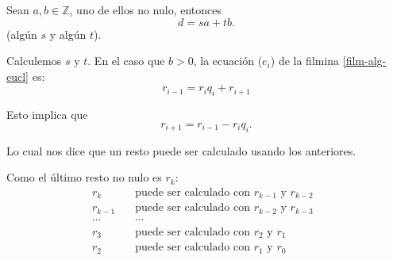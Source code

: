 \documentclass[handout]{beamer} %
\begin{document}
	
	
	\begin{frame}\label{film-alg-eucl-2}
		
		Sean $a, b \in \mathbb{Z}$, uno de ellos no nulo, entonces 
		$$
		d=sa+tb.
		$$
		(algún $s$ y algún $t$).
		
		
		Calculemos $s$ y $t$. En el caso que $b >0$,  la  ecuación ($e_{i}$) de la filmina \ref{film-alg-eucl} es:
		$$
		r_{i-1}=r_{i}q_{i} + r_{i+1}
		$$
		
		Esto implica que 
		$$
		r_{i+1} = r_{i-1}-r_{i}q_{i}.
		$$
		
		Lo cual nos dice que un resto puede ser calculado usando  los anteriores.
		
		\pause
		Como el último resto no nulo es $r_k$:
		\begin{align*}
			r_{k} \quad &\text{puede ser calculado con $r_{k-1}$ y $r_{k-2} $ } \\
			r_{k-1} \quad &\text{puede ser calculado con $r_{k-2}$ y $r_{k-3} $ } \\
			\cdots\quad &\cdots \\
			r_{3} \quad &\text{puede ser calculado con $r_{2}$ y $r_{1} $ } \\
			r_{2} \quad &\text{puede ser calculado con $r_{1}$ y $r_{0} $ } \\
		\end{align*}
		
		
	\end{frame}
	
	
	
\end{document}
